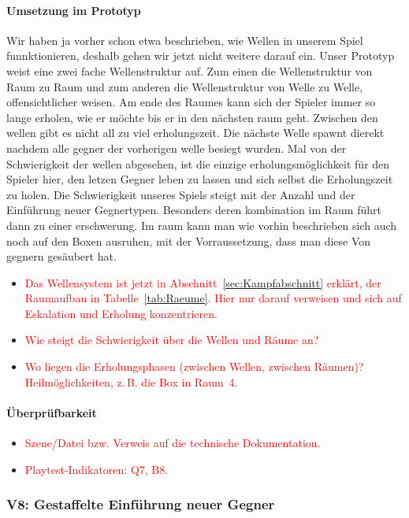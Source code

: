 \documentclass[../Main.tex]{subfiles}
\begin{document}
\paragraph{Umsetzung im Prototyp}
Wir haben ja vorher schon etwa beschrieben, wie Wellen in unserem Spiel funnktionieren, deshalb gehen wir jetzt nicht weitere darauf ein.
Unser Prototyp weist eine zwei fache Wellenstruktur auf. Zum einen die Wellenstruktur von Raum zu Raum und zum anderen die Wellenstruktur von Welle zu Welle, offensichtlicher weisen. Am ende des Raumes kann sich der Spieler immer so lange erholen, wie er möchte bis er in den nächsten raum geht. Zwischen den wellen gibt es nicht all zu viel erholungszeit. Die nächste Welle spawnt dierekt nachdem alle gegner der vorherigen welle besiegt wurden. Mal von der Schwierigkeit der wellen abgesehen, ist die einzige erholungsmöglichkeit für den Spieler hier, den letzen Gegner leben zu lassen und sich selbst die Erholungszeit zu holen.
Die Schwierigkeit unseres Spiels steigt mit der Anzahl und der Einführung neuer Gegnertypen. Besonders deren kombination im Raum führt dann zu einer erschwerung. Im raum kann man wie vorhin beschrieben sich auch noch auf den Boxen ausruhen, mit der Vorraussetzung, dass man diese Von gegnern gesäubert hat.
\begin{itemize}[leftmargin=1.5cm]
    \item \textcolor{red}{Das Wellensystem ist jetzt in Abschnitt~\ref{sec:Kampfabschnitt} erklärt, der Raumaufbau in Tabelle~\ref{tab:Raeume}. Hier nur darauf verweisen und sich auf Eskalation und Erholung konzentrieren.}
    \item \textcolor{red}{Wie steigt die Schwierigkeit über die Wellen und Räume an?}
    \item \textcolor{red}{Wo liegen die Erholungsphasen (zwischen Wellen, zwischen Räumen)? Heilmöglichkeiten, z.\,B. die Box in Raum~4.}
\end{itemize}

\paragraph{Überprüfbarkeit}
\begin{itemize}[leftmargin=1.5cm]
    \item \textcolor{red}{Szene/Datei bzw. Verweis auf die technische Dokumentation.}
    \item \textcolor{red}{Playtest-Indikatoren: Q7, B8.}
\end{itemize}

\subsubsection{V8: Gestaffelte Einführung neuer Gegner} \label{sec:V8}
\end{document}
